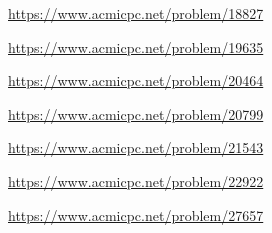 \begin{problem} \url{https://www.acmicpc.net/problem/18827} \end{problem}
\begin{problem} \url{https://www.acmicpc.net/problem/19635} \end{problem}
\begin{problem} \url{https://www.acmicpc.net/problem/20464} \end{problem}
\begin{problem} \url{https://www.acmicpc.net/problem/20799} \end{problem}
\begin{problem} \url{https://www.acmicpc.net/problem/21543} \end{problem}
\begin{problem} \url{https://www.acmicpc.net/problem/22922} \end{problem}
\begin{problem} \url{https://www.acmicpc.net/problem/27657} \end{problem}